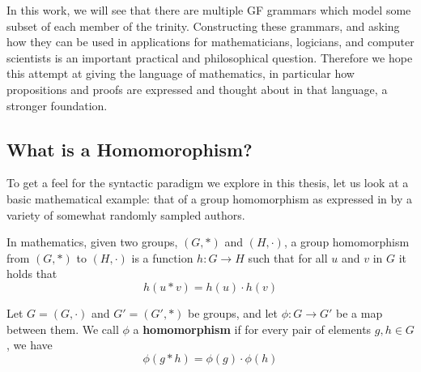 In this work, we will see that there are multiple GF grammars which model some
subset of each member of the trinity. Constructing these grammars, and asking
how they can be used in applications for mathematicians, logicians, and computer
scientists is an important practical and philosophical question. Therefore we
hope this attempt at giving the language of mathematics, in particular how
propositions and proofs are expressed and thought about in that language, a
stronger foundation.

\subsection{What is a Homomorophism?}

To get a feel for the syntactic paradigm we explore in this thesis, let us look at a basic mathematical
example: that of a group homomorphism as expressed in by a variety of somewhat
randomly sampled authors.  


\begin{definition}
In mathematics, given two groups, $(G, \ast)$ and $(H, \cdot)$, a group homomorphism from $(G, \ast)$ to $(H, \cdot)$ is a function $h : G \to H$ such that for all $u$ and $v$ in $G$ it holds that
  $$h(u \ast v) = h ( u ) \cdot h ( v )$$ 
\end{definition}


\begin{definition}
Let $G = (G,\cdot)$ and $G' = (G',\ast)$ be groups, and let $\phi : G \to G'$ be a map between them. We call $\phi$ a \textbf{homomorphism} if for every pair of elements $g, h \in G$, we have 
  $$\phi(g \ast h) = \phi ( g ) \cdot \phi ( h )$$ 
\end{definition}



